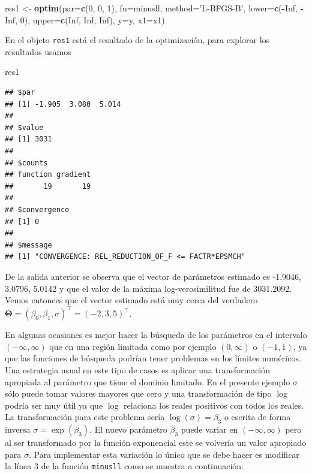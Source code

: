 \documentclass[10pt,]{krantz}
\makeatletter
\newenvironment{Shaded}{\begin{snugshade}}{\end{snugshade}}
\newcommand{\KeywordTok}[1]{\textcolor[rgb]{0.13,0.29,0.53}{\textbf{#1}}}
\newcommand{\DataTypeTok}[1]{\textcolor[rgb]{0.13,0.29,0.53}{#1}}
\newcommand{\DecValTok}[1]{\textcolor[rgb]{0.00,0.00,0.81}{#1}}
\newcommand{\StringTok}[1]{\textcolor[rgb]{0.31,0.60,0.02}{#1}}
\newcommand{\OtherTok}[1]{\textcolor[rgb]{0.56,0.35,0.01}{#1}}
\newcommand{\OperatorTok}[1]{\textcolor[rgb]{0.81,0.36,0.00}{\textbf{#1}}}
\newcommand{\NormalTok}[1]{#1}
\newenvironment{kframe}{%
\medskip{}
\setlength{\fboxsep}{.8em}
 \def\at@end@of@kframe{}%
 \ifinner\ifhmode%
  \def\at@end@of@kframe{\end{minipage}}%
  \begin{minipage}{\columnwidth}%
 \fi\fi%
 \def\FrameCommand##1{\hskip\@totalleftmargin \hskip-\fboxsep
 \colorbox{shadecolor}{##1}\hskip-\fboxsep
     \hskip-\linewidth \hskip-\@totalleftmargin \hskip\columnwidth}%
 \MakeFramed {\advance\hsize-\width
   \@totalleftmargin\z@ \linewidth\hsize
   \@setminipage}}%
 {\par\unskip\endMakeFramed%
 \at@end@of@kframe}
\renewenvironment{Shaded}{\begin{kframe}}{\end{kframe}}
\makeatother
\begin{document}
\begin{Shaded}
\begin{Highlighting}[]
\NormalTok{res1 <-}\StringTok{ }\KeywordTok{optim}\NormalTok{(}\DataTypeTok{par=}\KeywordTok{c}\NormalTok{(}\DecValTok{0}\NormalTok{, }\DecValTok{0}\NormalTok{, }\DecValTok{1}\NormalTok{), }\DataTypeTok{fn=}\NormalTok{minusll,}
              \DataTypeTok{method=}\StringTok{'L-BFGS-B'}\NormalTok{,}
              \DataTypeTok{lower=}\KeywordTok{c}\NormalTok{(}\OperatorTok{-}\OtherTok{Inf}\NormalTok{, }\OperatorTok{-}\OtherTok{Inf}\NormalTok{, }\DecValTok{0}\NormalTok{),}
              \DataTypeTok{upper=}\KeywordTok{c}\NormalTok{(}\OtherTok{Inf}\NormalTok{, }\OtherTok{Inf}\NormalTok{, }\OtherTok{Inf}\NormalTok{), }\DataTypeTok{y=}\NormalTok{y, }\DataTypeTok{x1=}\NormalTok{x1)}
\end{Highlighting}
\end{Shaded}

En el objeto \texttt{res1} está el resultado de la optimización, para
explorar los resultados usamos

\begin{Shaded}
\begin{Highlighting}[]
\NormalTok{res1}
\end{Highlighting}
\end{Shaded}

\begin{verbatim}
## $par
## [1] -1.905  3.080  5.014
## 
## $value
## [1] 3031
## 
## $counts
## function gradient 
##       19       19 
## 
## $convergence
## [1] 0
## 
## $message
## [1] "CONVERGENCE: REL_REDUCTION_OF_F <= FACTR*EPSMCH"
\end{verbatim}

De la salida anterior se observa que el vector de parámetros estimado es
-1.9046, 3.0796, 5.0142 y que el valor de la máxima log-verosimilitud
fue de 3031.2092. Vemos entonces que el vector estimado está muy cerca
del verdadero
\(\boldsymbol{\Theta}=(\beta_0, \beta_1, \sigma)^\top=(-2, 3, 5)^\top\).

En algunas ocasiones es mejor hacer la búsqueda de los parámetros en el
intervalo \((-\infty, \infty)\) que en una región limitada como por
ejemplo \((0, \infty)\) o \((-1, 1)\), ya que las funciones de búsqueda
podrían tener problemas en los límites numéricos. Una estrategia usual
en este tipo de casos es aplicar una transformación apropiada al
parámetro que tiene el dominio limitado. En el presente ejemplo
\(\sigma\) sólo puede tomar valores mayores que cero y una
transformación de tipo \(\log\) podría ser muy útil ya que \(\log\)
relaciona los reales positivos con todos los reales. La transformación
para este problema sería \(\log(\sigma)=\beta_3\) o escrita de forma
inversa \(\sigma=\exp(\beta_3)\). El nuevo parámetro \(\beta_3\) puede
variar en \((-\infty, \infty)\) pero al ser transformado por la función
exponencial este se volvería un valor apropiado para \(\sigma\). Para
implementar esta variación lo único que se debe hacer es modificar la
línea 3 de la función \texttt{minusll} como se muestra a continuación:
\end{document}
